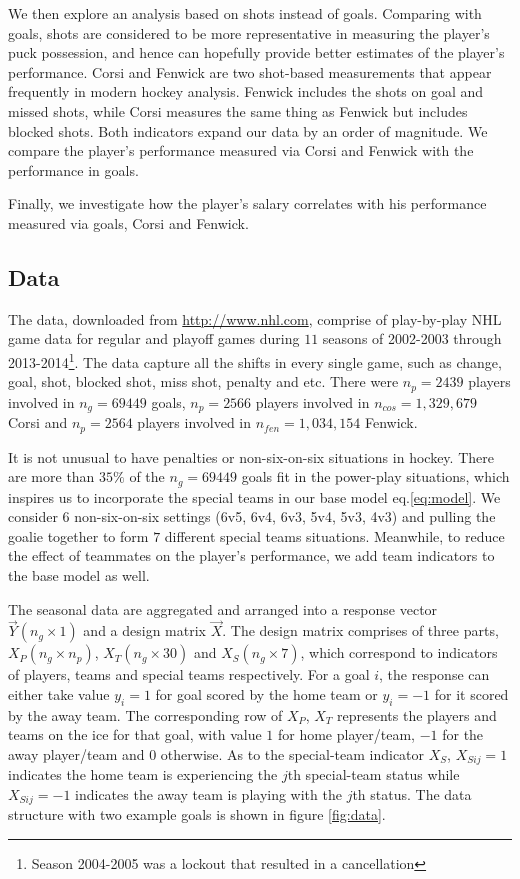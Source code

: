 We then explore an analysis based on shots instead of goals. Comparing with goals, shots are considered to be more representative in measuring the player's puck possession, and hence can hopefully provide better estimates of the player's performance. Corsi and Fenwick are two shot-based measurements that appear frequently in modern hockey analysis. Fenwick includes the shots on goal and missed shots, while Corsi measures the same thing as Fenwick but includes blocked shots. Both indicators expand our data by an order of magnitude. We compare the player's performance measured via Corsi and Fenwick with the performance in goals.

Finally, we investigate how the player's salary correlates with his performance measured via goals, Corsi and Fenwick.

\subsection{Data}
The data, downloaded from \url{http://www.nhl.com}, comprise of play-by-play NHL game data for regular and playoff games during $11$ seasons of 2002-2003 through 2013-2014\footnote{Season 2004-2005 was a lockout that resulted in a cancellation}. The data capture all the shifts in every single game, such as change, goal, shot, blocked shot, miss shot, penalty and etc. There were $n_p=2439$ players involved in $n_g=69449$ goals, $n_p=2566$ players involved in $n_{cos}=1,329,679$ Corsi and $n_p=2564$ players involved in $n_{fen}=1,034,154$ Fenwick.

It is not unusual to have penalties or non-six-on-six situations in hockey. There are more than $35\%$ of the $n_g=69449$ goals fit in the power-play situations, which inspires us to incorporate the special teams in our base model eq.\eqref{eq:model}. We consider $6$ non-six-on-six settings (6v5, 6v4, 6v3, 5v4, 5v3, 4v3) and pulling the goalie together to form $7$ different special teams situations. Meanwhile, to reduce the effect of teammates on the player's performance, we add team indicators to the base model as well.

The seasonal data are aggregated and arranged into a response vector $\vec{Y}(n_g \times 1)$ and a design matrix $\vec{X}$. The design matrix comprises of three parts, $X_P(n_g\times n_p)$, $X_T(n_g\times 30)$ and $X_S(n_g\times 7)$, which correspond to indicators of players, teams and special teams respectively. For a goal $i$, the response can either take value $y_i=1$ for goal scored by the home team or $y_i={-1}$ for it scored by the away team. The corresponding row of $X_P$, $X_T$ represents the players and teams on the ice for that goal, with value $1$ for home player/team, ${-1}$ for the away player/team and $0$ otherwise. As to the special-team indicator $X_S$, $X_{Sij}=1$ indicates the home team is experiencing the $j$th special-team status while $X_{Sij}=-1$ indicates the away team is playing with the $j$th status. The data structure with two example goals is shown in figure \ref{fig:data}.

